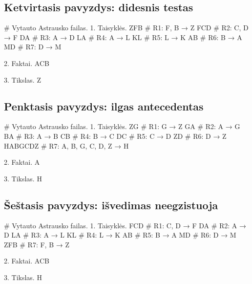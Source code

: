 \subsection{Ketvirtasis pavyzdys: didesnis testas}

\begin{pythonaienv}[fc]
# Vytauto Astrausko failas.
1. Taisyklės.
ZFB                                     # R1: F, B → Z
FCD                                     # R2: C, D → F
DA                                      # R3: A → D
LA                                      # R4: A → L
KL                                      # R5: L → K
AB                                      # R6: B → A
MD                                      # R7: D → M

2. Faktai.
ACB

3. Tikslas.
Z
\end{pythonaienv}

\subsection{Penktasis pavyzdys: ilgas antecedentas}

\begin{pythonaienv}[fc]
# Vytauto Astrausko failas.
1. Taisyklės.
ZG                                      # R1: G → Z
GA                                      # R2: A → G
BA                                      # R3: A → B
CB                                      # R4: B → C
DC                                      # R5: C → D
ZD                                      # R6: D → Z
HABGCDZ                                 # R7: A, B, G, C, D, Z → H

2. Faktai.
A

3. Tikslas.
H
\end{pythonaienv}

\subsection{Šeštasis pavyzdys: išvedimas neegzistuoja}

\begin{pythonaienv}[fc]
# Vytauto Astrausko failas.
1. Taisyklės.
FCD                                     # R1: C, D → F
DA                                      # R2: A → D
LA                                      # R3: A → L
KL                                      # R4: L → K
AB                                      # R5: B → A
MD                                      # R6: D → M
ZFB                                     # R7: F, B → Z

2. Faktai.
ACB

3. Tikslas.
H
\end{pythonaienv}

